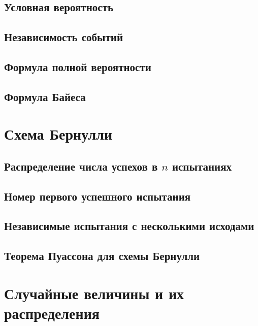 \subsection{Условная вероятность}


\subsection{Независимость событий}


\subsection{Формула полной вероятности}


\subsection{Формула Байеса}





\section{Схема Бернулли}

\subsection{Распределение числа успехов в \texorpdfstring{$n$}{n} испытаниях}


\subsection{Номер первого успешного испытания}


\subsection{Независимые испытания с несколькими исходами}


\subsection{Теорема Пуассона для схемы Бернулли}





\section{Случайные величины и их распределения}


